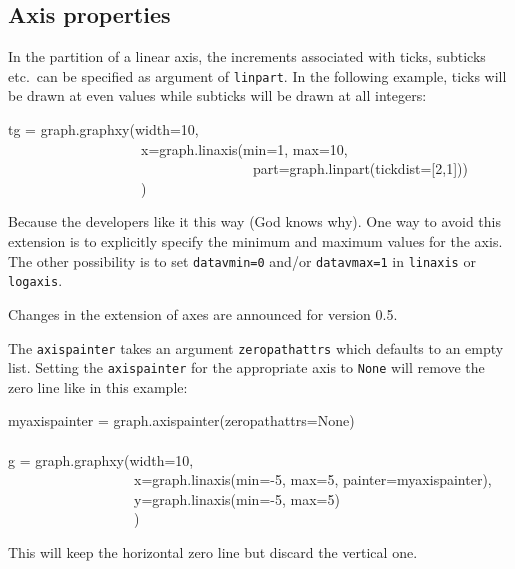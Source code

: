 \documentclass[11pt,DIV14]{scrartcl}
\begin{document}
{}
{}

{}
{
}

\subsection{Axis properties}

{}
{In the partition of a linear axis, the increments associated with ticks,
subticks etc.\ can be specified as argument of \texttt{linpart}. In the
following example, ticks will be drawn at even values while subticks will
be drawn at all integers:
\begin{progcode}
tg = graph.graphxy(width=10,\\
~~~~~~~~~~~~~~~~~~~x=graph.linaxis(min=1, max=10,\\
~~~~~~~~~~~~~~~~~~~~~~~~~~~~~~~~~~~part=graph.linpart(tickdist=[2,1]))\\
~~~~~~~~~~~~~~~~~~~)
\end{progcode}
}

{}
{Because the developers like it this way (God knows why). One way to avoid
this extension is to explicitly specify the minimum and maximum values for
the axis. The other possibility is to set \texttt{datavmin=0} and/or
\texttt{datavmax=1} in \texttt{linaxis} or \texttt{logaxis}. 

Changes in the extension of axes are announced for version 0.5.
}

{}
{\label{q:zeropathattrs}
The \texttt{axispainter} takes an argument \texttt{zeropathattrs} which 
defaults to an empty list. Setting the \texttt{axispainter} for the
appropriate axis to \texttt{None} will remove the zero line like in this
example:
\begin{progcode}
myaxispainter = graph.axispainter(zeropathattrs=None)\\
\\
g = graph.graphxy(width=10,\\
~~~~~~~~~~~~~~~~~~x=graph.linaxis(min=-5, max=5, painter=myaxispainter),\\
~~~~~~~~~~~~~~~~~~y=graph.linaxis(min=-5, max=5)\\
~~~~~~~~~~~~~~~~~~)
\end{progcode}
This will keep the horizontal zero line but discard the vertical one.
}
\end{document}
